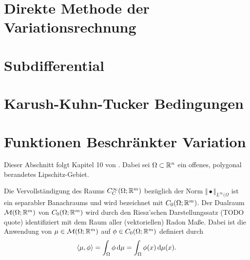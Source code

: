 
\section{Direkte Methode der Variationsrechnung}
\section{Subdifferential}
\section{Karush-Kuhn-Tucker Bedingungen}

\section{Funktionen Beschränkter Variation}

Dieser Abschnitt folgt Kapitel 10 von \cite{Bar15}.
Dabei sei $\Omega \subset \mathbb{R}^n$ ein offenes, polygonal berandetes
Lipschitz-Gebiet.


\begin{definition}
  Die Vervollständigung des Raums $C^\infty_C(\Omega;\mathbb{R}^m)$ bezüglich der 
  Norm
  $\Vert\bullet\Vert_{L^\infty(\Omega}$ ist ein separabler Banachraums und wird
  bezeichnet mit 
  $C_0(\Omega; \mathbb{R}^m)$.
  Der Dualraum $\mathcal{M}(\Omega;\mathbb{R}^m)$ von $C_0(\Omega; \mathbb{R}^m)$ wird
  durch den Riesz'schen Darstellungssatz (TODO quote) identifiziert mit
  dem Raum aller (vektoriellen) Radon Maße. Dabei ist die Anwendung
  von $\mu\in \mathcal{M}(\Omega;\mathbb{R}^m)$
  auf $\phi\in C_0(\Omega;\mathbb{R}^m)$ definiert durch
  \begin{align*}
    \langle \mu, \phi\rangle = \int_\Omega \phi \,\mathrm{d}\mu =
    \int_\Omega \phi(x) \,\mathrm{d}\mu(x).
  \end{align*}
\end{definition}

